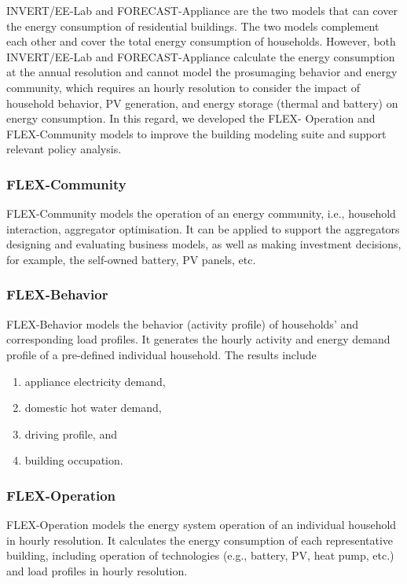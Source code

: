 INVERT/EE-Lab and FORECAST-Appliance are the two models that can cover the energy consumption of residential buildings. The two models complement each other and cover the total energy consumption of households. 
However, both INVERT/EE-Lab and FORECAST-Appliance calculate the energy consumption at the annual resolution and cannot model the prosumaging behavior and energy community, which requires an hourly resolution to consider the impact of household behavior, PV generation, and energy storage (thermal and battery) on energy consumption. In this regard, we developed the FLEX- Operation and FLEX-Community models to improve the building modeling suite and support relevant policy analysis.

\subsubsection{FLEX-Community}

FLEX-Community models the operation of an energy community, i.e., household interaction, aggregator optimisation. 
It can be applied to support the aggregators designing and evaluating business models, as well as making investment decisions, for example, the self-owned battery, PV panels, etc.

\subsubsection{FLEX-Behavior}

FLEX-Behavior models the behavior (activity profile) of households' and corresponding load profiles. 
It generates the hourly activity and energy demand profile of a pre-defined individual household. 
The results include

\begin{enumerate}
  \item appliance electricity demand,
  \item domestic hot water demand,
  \item driving profile, and
  \item building occupation.
\end{enumerate}

\subsubsection{FLEX-Operation}

FLEX-Operation models the energy system operation of an individual household in hourly resolution.  
It calculates the energy consumption of each representative building, including operation of technologies (e.g., battery, PV, heat pump, etc.) and load profiles in hourly resolution.

